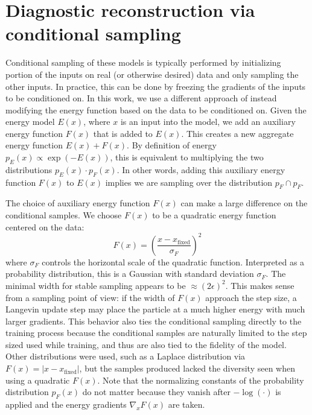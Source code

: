 
\section{Diagnostic reconstruction via conditional sampling}

Conditional sampling of these models is typically performed by initializing portion of the inputs on real (or otherwise desired) data and only sampling the other inputs. In practice, this can be done by freezing the gradients of the inputs to be conditioned on. In this work, we use a different approach of instead modifying the energy function based on the data to be conditioned on. Given the energy model $E(x)$, where $x$ is an input into the model, we add an auxiliary energy function $F(x)$ that is added to $E(x)$. This creates a new aggregate energy function $E(x) + F(x)$. By definition of energy $p_E(x) \propto \exp(-E(x))$, this is equivalent to multiplying the two distributions $p_E(x) \cdot p_F(x)$. In other words, adding this auxiliary energy function $F(x)$ to $E(x)$ implies we are sampling over the distribution $p_F \cap p_F$.

The choice of auxiliary energy function $F(x)$ can make a large difference on the conditional samples. We choose $F(x)$ to be a quadratic energy function centered on the data: 
\begin{equation}
	F(x) = \left(\frac{x - x_\text{fixed}}{\sigma_F} \right)^2
\end{equation}
where $\sigma_F$ controls the horizontal scale of the quadratic function. Interpreted as a probability distribution, this is a Gaussian with standard deviation $\sigma_F$. The minimal width for stable sampling appears to be $\approx (2 \epsilon)^2$. This makes sense from a sampling point of view: if the width of $F(x)$ approach the step size, a Langevin update step may place the particle at a much higher energy with much larger gradients. This behavior also ties the conditional sampling directly to the training process because the conditional samples are naturally limited to the step sized used while training, and thus are also tied to the fidelity of the model. Other distributions were used, such as a Laplace distribution via $F(x) = \vert x - x_\text{fixed} \vert$, but the samples produced lacked the diversity seen when using a quadratic $F(x)$. Note that the normalizing constants of the probability distribution $p_F(x)$ do not matter because they vanish after $-\log(\cdot)$ is applied and the energy gradients $\nabla_x F(x)$ are taken.

